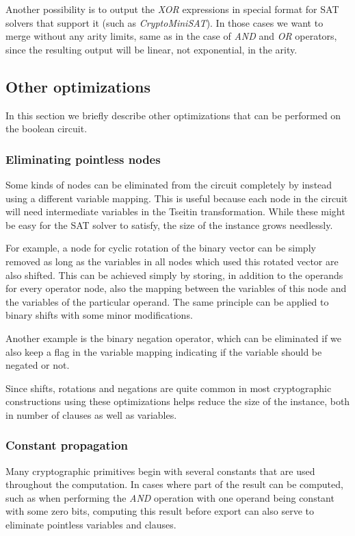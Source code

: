 Another possibility is to output the \emph{XOR} expressions in special format for SAT solvers that support it (such as \emph{CryptoMiniSAT}).
In those cases we want to merge without any arity limits, same as in the case of \emph{AND} and \emph{OR} operators, since the resulting output will be linear, not exponential, in the arity.

\subsection{Other optimizations}
In this section we briefly describe other optimizations that can be performed on the boolean circuit.

\subsubsection{Eliminating pointless nodes}
Some kinds of nodes can be eliminated from the circuit completely by instead using a different variable mapping.
This is useful because each node in the circuit will need intermediate variables in the Tseitin transformation.
While these might be easy for the SAT solver to satisfy, the size of the instance grows needlessly.

For example, a node for cyclic rotation of the binary vector can be simply removed as long as the variables in all nodes which used this rotated vector are also shifted.
This can be achieved simply by storing, in addition to the operands for every operator node, also the mapping between the variables of this node and the variables of the particular operand.
The same principle can be applied to binary shifts with some minor modifications.

Another example is the binary negation operator, which can be eliminated if we also keep a flag in the variable mapping indicating if the variable should be negated or not.

Since shifts, rotations and negations are quite common in most cryptographic constructions using these optimizations helps reduce the size of the instance, both in number of clauses as well as variables.

\subsubsection{Constant propagation}
Many cryptographic primitives begin with several constants that are used throughout the computation.
In cases where part of the result can be computed, such as when performing the \emph{AND} operation with one operand being constant with some zero bits, computing this result before export can also serve to eliminate pointless variables and clauses.


